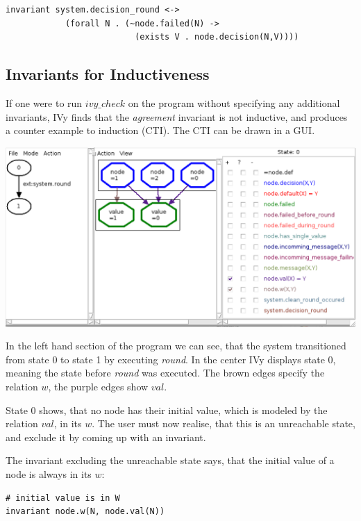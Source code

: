 \documentclass[fleqn]{article}
\begin{document}
\begin{mdframed}[nobreak=true, backgroundcolor=light-gray, roundcorner=10pt,leftmargin=1, rightmargin=1, innerleftmargin=15, innertopmargin=15,innerbottommargin=15, outerlinewidth=1, linecolor=light-gray]
\begin{lstlisting}
invariant system.decision_round <->
            (forall N . (~node.failed(N) ->
                          (exists V . node.decision(N,V))))
\end{lstlisting}
\end{mdframed}

\subsection{Invariants for Inductiveness}
If one were to run $ivy\_check$ on the program without specifying any
additional invariants, IVy finds that the \textit{agreement} invariant is not inductive,
and produces a counter example to induction (CTI). The CTI can be drawn in a GUI.

\noindent\includegraphics[width=\textwidth]{gui.png}

\noindent In the left hand section of the program we can see, that the system transitioned from state 0
to state 1 by executing \textit{round}. In the center IVy displays state 0, meaning the state
before \textit{round} was executed. The brown edges specify the relation $w$, the purple edges
show $val$.

State 0 shows, that no node has their initial value, which is modeled by the relation $val$,
in its $w$. The user must now realise, that this is an unreachable state, and exclude it by coming
up with an invariant.

The invariant excluding the unreachable state says, that the initial value of a node is always in its $w$:
\begin{mdframed}[nobreak=true, backgroundcolor=light-gray, roundcorner=10pt,leftmargin=1, rightmargin=1, innerleftmargin=15, innertopmargin=15,innerbottommargin=15, outerlinewidth=1, linecolor=light-gray]
\begin{lstlisting}
# initial value is in W
invariant node.w(N, node.val(N))
\end{lstlisting}
\end{mdframed}
\end{document}
